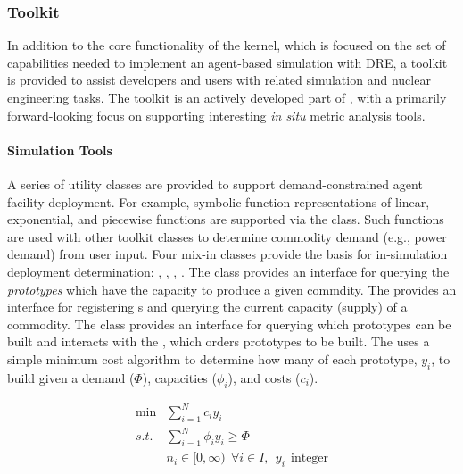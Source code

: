 \subsubsection{Toolkit}

In addition to the core functionality of the \Cyclus kernel, which is focused on
the set of capabilities needed to implement an agent-based simulation
with \gls{DRE}, a toolkit is provided to assist developers
and users with related simulation and nuclear engineering tasks. The toolkit is
an actively developed part of \Cyclus, with a primarily forward-looking
focus on supporting interesting \textit{in situ} metric analysis tools.

\paragraph{Simulation Tools}

A series of utility classes are provided to support demand-constrained agent
facility deployment. For example, symbolic function representations of linear,
exponential, and piecewise functions are supported via the
 class. Such functions are used with other toolkit
classes to determine commodity demand (e.g., power demand) from user input. Four
mix-in classes provide the basis for in-simulation deployment determination:
, , ,
. The  class provides an
interface for querying the \textit{prototypes} which have the
capacity to produce a given commdity. The 
provides an interface for registering s and querying
the current capacity (supply) of a commodity. The  class provides
an interface for querying which prototypes can be built and interacts with the
, which orders prototypes to be built. The
 uses a simple minimum cost algorithm to determine how
many of each prototype, $y_i$, to build given a demand ($\Phi$), capacities
($\phi_i$), and costs ($c_i$).

\begin{equation}
\begin{aligned}
 \min & \sum_{i=1}^{N}c_i y_i \\
 s.t. & \sum_{i=1}^{N}\phi_i y_i \ge \Phi \\
      & n_i \in [0,\infty) \:\: \forall i \in I, \:\: y_i \:\: \text{integer}
\end{aligned}
\end{equation}

